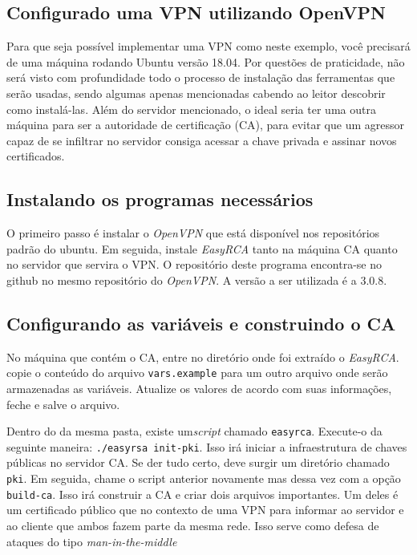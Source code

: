 \documentclass[12pt]{article}
\begin{document}
\subsection{Configurado uma VPN utilizando OpenVPN}

Para que seja possível implementar uma VPN como neste exemplo, você precisará
de uma máquina rodando Ubuntu versão 18.04. Por questões de praticidade, não será
visto com profundidade todo o processo de instalação das ferramentas que serão usadas, sendo algumas 
apenas mencionadas cabendo ao leitor descobrir como instalá-las. Além do servidor mencionado,
o ideal seria ter uma outra máquina para ser a autoridade de certificação (CA), para evitar
que um agressor capaz de se infiltrar no servidor consiga acessar a chave privada
e assinar novos certificados. 

\subsection{Instalando os programas necessários}

O primeiro passo é instalar o \emph{OpenVPN} que está disponível nos repositórios padrão do ubuntu.
Em seguida, instale \emph{EasyRCA} tanto na máquina CA quanto no servidor que servira o VPN.
O repositório deste programa encontra-se no github no mesmo repositório do \emph{OpenVPN}. 
A versão a ser utilizada é a 3.0.8.

\subsection{Configurando as variáveis e construindo o CA}

No máquina que contém o CA, entre no diretório onde foi extraído o \emph{EasyRCA}. copie o conteúdo
do arquivo \texttt{vars.example} para um outro arquivo onde serão armazenadas as variáveis. Atualize
os valores de acordo com suas informações, feche e salve o arquivo. 

Dentro do da mesma pasta, existe um\emph{script} chamado \texttt{easyrca}. Execute-o da seguinte
maneira: \texttt{./easyrsa init-pki}. Isso irá iniciar a infraestrutura de chaves públicas no servidor CA.
Se der tudo certo, deve surgir um diretório chamado \texttt{pki}. Em seguida, chame o script anterior 
novamente mas dessa vez com a opção \texttt{build-ca}. Isso irá construir a CA e criar
dois arquivos importantes. Um deles é um certificado público que no contexto de uma VPN para informar
ao servidor e ao cliente que ambos fazem parte da mesma rede. Isso serve como defesa de ataques 
do tipo \emph{man-in-the-middle} 
\end{document}
